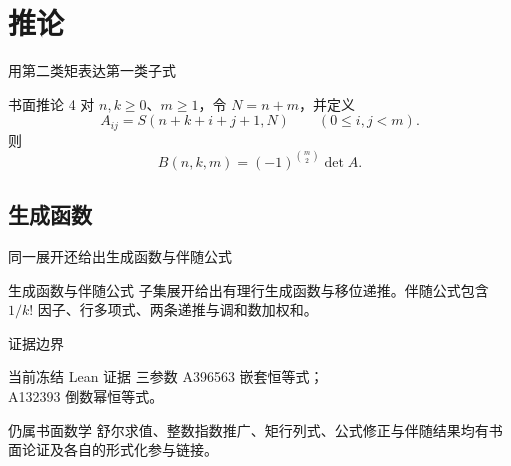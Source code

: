 \documentclass{beamer}
\begin{document}
\section{推论}
\begin{frame}{用第二类矩表达第一类子式}
  \begin{block}{书面推论 4}
    对 $n,k\ge0$、$m\ge1$，令 $N=n+m$，并定义
    \[ A_{ij}=S(n+k+i+j+1,N)\qquad(0\le i,j<m). \]
    则
    \[ B(n,k,m)=(-1)^{\binom m2}\det A. \]
  \end{block}
\end{frame}

\subsection{生成函数}
\begin{frame}{同一展开还给出生成函数与伴随公式}
  \begin{block}{生成函数与伴随公式}
    子集展开给出有理行生成函数与移位递推。伴随公式包含 $1/k!$ 因子、行多项式、两条递推与调和数加权和。
  \end{block}
\end{frame}
\begin{frame}{证据边界}
  \begin{block}{当前冻结 Lean 证据}
    三参数 A396563 嵌套恒等式；\\
    A132393 倒数幂恒等式。
  \end{block}
  \begin{alertblock}{仍属书面数学}
    舒尔求值、整数指数推广、矩行列式、公式修正与伴随结果均有书面论证及各自的形式化参与链接。
  \end{alertblock}
\end{frame}
\appendix
\FormalVerification
\end{document}
